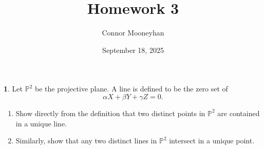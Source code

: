 \documentclass[12pt]{article}
\title{Homework 3}
\author{Connor Mooneyhan}
\date{September 18, 2025}
\theoremstyle{definition}
\newtheorem{ex}{}
\begin{document}
\maketitle

\begin{ex}
	Let $\mathbb{P}^2$ be the projective plane.
	A line is defined to be the zero set of \begin{equation*}
		\alpha X + \beta Y + \gamma Z = 0.
	\end{equation*}
	\begin{enumerate}[label=(\alph*)]
		\item Show directly from the definition that two distinct points in $\mathbb{P}^2$ are contained in a unique line.
		\item Similarly, show that any two distinct lines in $\mathbb{P}^2$ intersect in a unique point.
	\end{enumerate}
\end{ex}
\end{document}
